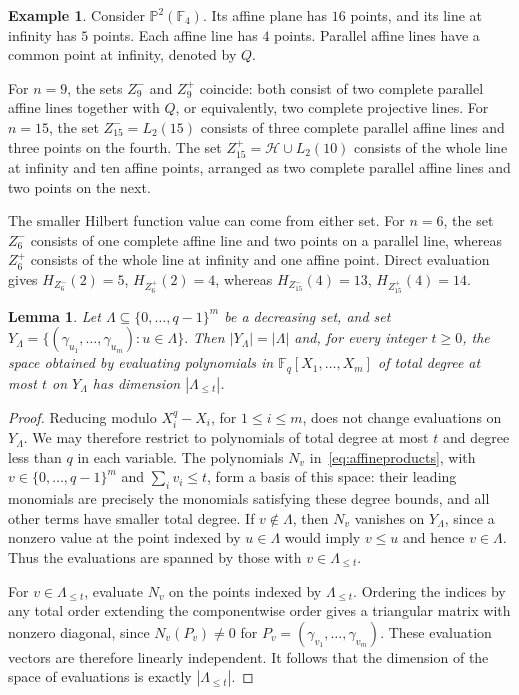 \documentclass[11pt]{amsart}
\newtheorem{lemma}[theorem]{Lemma}
\theoremstyle{definition}
\newtheorem{example}[theorem]{Example}
\newcommand{\F}{\mathbb F}
\newcommand{\PP}{\mathbb P}
\newcommand{\card}[1]{\left|#1\right|}
\numberwithin{equation}{section}
\begin{document}
\begin{example}\label{ex:planefilling}
Consider $\PP^2(\F_4)$. Its affine plane has $16$ points, and
its line at infinity has $5$ points. Each affine line has $4$
points. Parallel affine lines have a common point at infinity,
denoted by $Q$. 

For $n=9$, the sets $Z_9^-$ and $Z_9^+$ coincide: both consist
of two complete parallel affine lines together with $Q$,
or equivalently, two complete projective lines.
For $n=15$, the set $Z_{15}^-=L_2(15)$ consists of three
complete parallel affine lines and three points on the fourth.
The set $Z_{15}^+=\mathcal H\cup L_2(10)$ consists of the whole
line at infinity and ten affine points, arranged as two
complete parallel affine lines and two points on the next.

The smaller Hilbert function value can come from either set.
For $n=6$, the set $Z_6^-$ consists of one complete affine line
and two points on a parallel line, whereas $Z_6^+$ consists
of the whole line at infinity and one affine point.
Direct evaluation gives $H_{Z_6^-}(2)=5$, $H_{Z_6^+}(2)=4$,
whereas $H_{Z_{15}^-}(4)=13$, $H_{Z_{15}^+}(4)=14$.
\end{example}

\begin{lemma}\label{lem:lowerrealization}
Let $\Lambda\subseteq\{0,\ldots,q-1\}^m$ be a decreasing set, and set
\(
 Y_\Lambda=\{(\gamma_{u_1},\ldots,\gamma_{u_m}):u\in\Lambda\}.
\)
Then $\card{Y_\Lambda}=\card\Lambda$ and, for every integer $t\ge0$,
the space obtained by evaluating polynomials in
$\F_q[X_1,\ldots,X_m]$ of total degree at most $t$ on $Y_\Lambda$
has dimension $\card{\Lambda_{\le t}}$.
\end{lemma}

\begin{proof}
Reducing modulo $X_i^q-X_i$, for $1\le i\le m$, does not  change evaluations on $Y_\Lambda$.
We may therefore restrict to polynomials of total degree at most $t$
and degree less than $q$ in each variable.
The polynomials $N_v$ in~\eqref{eq:affineproducts}, with
$v\in\{0,\ldots,q-1\}^m$ and $\sum_i v_i\le t$, form a basis
of this space: their leading monomials are precisely the monomials
satisfying these degree bounds, and all other terms have smaller
total degree.
If $v\notin\Lambda$, then $N_v$ vanishes on $Y_\Lambda$, since
a nonzero value at the point indexed by $u\in\Lambda$ would imply
$v\le u$ and hence $v\in\Lambda$.
Thus the evaluations are spanned by those with $v\in\Lambda_{\le t}$.

For $v\in\Lambda_{\le t}$, evaluate $N_v$ on the points indexed by
$\Lambda_{\le t}$. Ordering the indices by any total order extending
the componentwise order gives a triangular matrix with nonzero
diagonal, since $N_v(P_v)\ne0$ for
$P_v=(\gamma_{v_1},\ldots,\gamma_{v_m})$.
These evaluation vectors are therefore linearly independent.
It follows that the dimension of the space of evaluations is exactly
$\card{\Lambda_{\le t}}$.
\end{proof}
\end{document}

